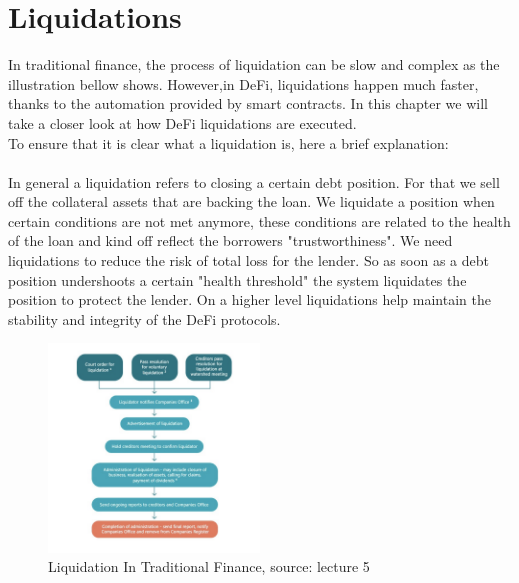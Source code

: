 \documentclass{article}
\begin{document}
\section{Liquidations}
In traditional finance, the process of liquidation can be slow and complex as the illustration bellow shows. However,in DeFi, liquidations happen much faster, thanks to the automation provided by smart contracts. In this chapter we will take a closer look at how DeFi liquidations are executed.\\To ensure that it is clear what a liquidation is, here a brief explanation:\\\\ In general a liquidation refers to closing a certain debt position. For that we sell off the collateral assets that are backing the loan. We liquidate a position when certain conditions are not met anymore, these conditions are related to the health of the loan and kind off reflect the borrowers "trustworthiness". We need liquidations to reduce the risk of total loss for the lender. So as soon as a debt position undershoots a certain "health threshold" the system liquidates the position to protect the lender. On a higher level liquidations help maintain the stability and integrity of the DeFi protocols.\\

\begin{figure}[h]
    \centering
    \includegraphics[width=0.5\textwidth]{Bildschirmfoto 2024-04-06 um 23.43.54.png} 
    \caption{Liquidation In Traditional Finance, \scriptsize{source: lecture 5}}
    \label{fig:DoS-attack}
\end{figure}
\end{document}
